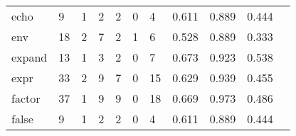 \begin{longtable}{lp{1.2cm}p{1.2cm}p{1.2cm}p{1.2cm}p{1.2cm}p{1.2cm}p{1.2cm}p{1.2cm}p{1.2cm}p{1.2cm}}
echo      &                                     9 &                                                  1 &                                                  2 &                                                  2 &                                                  0 &                                                  4 &                                         0.611 &                                              0.889 &                                              0.444 \\
env       &                                    18 &                                                  2 &                                                  7 &                                                  2 &                                                  1 &                                                  6 &                                         0.528 &                                              0.889 &                                              0.333 \\
expand    &                                    13 &                                                  1 &                                                  3 &                                                  2 &                                                  0 &                                                  7 &                                         0.673 &                                              0.923 &                                              0.538 \\
expr      &                                    33 &                                                  2 &                                                  9 &                                                  7 &                                                  0 &                                                 15 &                                         0.629 &                                              0.939 &                                              0.455 \\
factor    &                                    37 &                                                  1 &                                                  9 &                                                  9 &                                                  0 &                                                 18 &                                         0.669 &                                              0.973 &                                              0.486 \\
false     &                                     9 &                                                  1 &                                                  2 &                                                  2 &                                                  0 &                                                  4 &                                         0.611 &                                              0.889 &                                              0.444 \\

\end{longtable}
